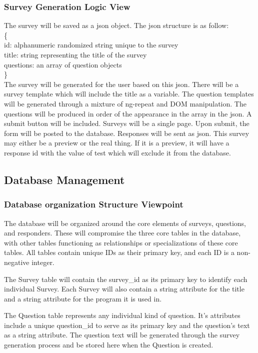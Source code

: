 \subsubsection{Survey Generation Logic View}
The survey will be saved as a json object. The json structure is as follow:\\
\{\\
\indent id: alphanumeric randomized string unique to the survey\\
\indent title: string representing the title of the survey\\
\indent questions: an array of question objects\\
\}\\
The survey will be generated for the user based on this json. There will be a survey template which will include the title as a variable.
The question templates will be generated through a mixture of ng-repeat and DOM manipulation. The questions will be produced in 
order of the appearance in the array in the json. A submit button will be included. Surveys will be a single page. Upon submit, the form will be posted to the database. Responses will be sent as json. This survey may either be a preview or the real thing. If it is a 
preview, it will have a response id with the value of test which will exclude it from the database.

\subsection{Database Management}
\subsubsection{Database organization Structure Viewpoint}
The database will be organized around the core elements of surveys, questions, and responders.
These will compromise the three core tables in the database, with other tables functioning as relationships or specializations of these core tables.
All tables contain unique IDs as their primary key, and each ID is a non-negative integer.

The Survey table will contain the survey\_id as its primary key to identify each individual Survey.
Each Survey will also contain a string attribute for the title and a string attribute for the program it is used in.

The Question table represents any individual kind of question.
It's attributes include a unique question\_id to serve as its primary key and the question's text as a string attribute.
The question text will be generated through the survey generation process and be stored here when the Question is created.

